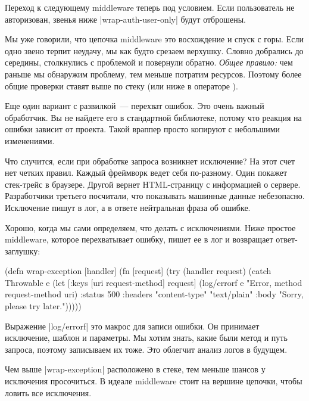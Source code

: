 Переход к следующему middleware теперь под условием. Если пользователь не
авторизован, звенья ниже \spverb|wrap-auth-user-only| будут отброшены.

Мы уже говорили, что цепочка middleware это восхождение и спуск с горы. Если
одно звено терпит неудачу, мы как будто срезаем верхушку. Словно добрались до
середины, столкнулись с проблемой и повернули обратно. \emph{Общее правило:} чем
раньше мы обнаружим проблему, тем меньше потратим ресурсов. Поэтому более общие
проверки ставят выше по стеку (или ниже в операторе \arr).

Еще один вариант с развилкой~--- перехват ошибок. Это очень важный
обработчик. Вы не найдете его в стандартной библиотеке, потому что реакция на
ошибки зависит от проекта. Такой враппер просто копируют с небольшими
изменениями.

Что случится, если при обработке запроса возникнет исключение? На этот счет нет
четких правил. Каждый фреймворк ведет себя по-разному. Один покажет стек-трейс в
браузере. Другой вернет HTML-страницу с информацией о сервере. Разработчики
третьего посчитали, что показывать машинные данные небезопасно. Исключение пишут
в лог, а в ответе нейтральная фраза об ошибке.

Хорошо, когда мы сами определяем, что делать с исключениями. Ниже простое
middleware, которое перехватывает ошибку, пишет ее в лог и возвращает
ответ-заглушку:

\begin{english}
  \begin{clojure}
(defn wrap-exception [handler]
  (fn [request]
    (try
      (handler request)
      (catch Throwable e
        (let [{:keys [uri
                      request-method]} request]
          (log/errorf e "Error, method %
                      request-method uri)
          {:status 500
           :headers {"content-type" "text/plain"}
           :body "Sorry, please try later."})))))
  \end{clojure}
\end{english}

Выражение \spverb|log/errorf| это макрос для записи ошибки. Он принимает
исключение, шаблон и параметры. Мы хотим знать, какие были метод и путь запроса,
поэтому записываем их тоже. Это облегчит анализ логов в будущем.

Чем выше \spverb|wrap-exception| расположено в стеке, тем меньше шансов у
исключения просочиться. В идеале middleware стоит на вершине цепочки, чтобы
ловить все исключения.

